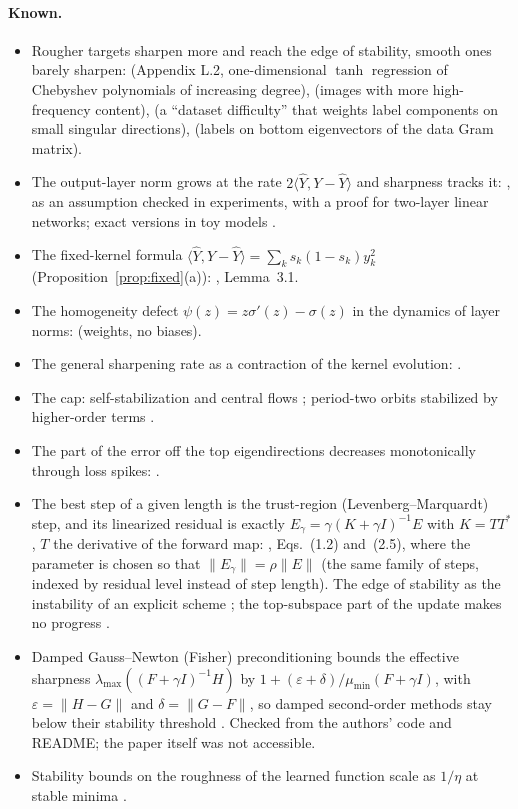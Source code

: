 \documentclass[11pt]{article}
\theoremstyle{definition}
\theoremstyle{remark}
\newcommand{\ip}[2]{\langle #1,#2\rangle}
\begin{document}
\paragraph{Known.}
\begin{itemize}
\item Rougher targets sharpen more and reach the edge of stability, smooth ones barely sharpen: \cite{cohen2021} (Appendix L.2, one-dimensional $\tanh$ regression of Chebyshev polynomials of increasing degree), \cite{ghosh2025} (images with more high-frequency content), \cite{yoo2025} (a ``dataset difficulty'' that weights label components on small singular directions), \cite{liwangli2022} (labels on bottom eigenvectors of the data Gram matrix).
\item The output-layer norm grows at the rate $2\ip{\hat Y}{Y - \hat Y}$ and sharpness tracks it: \cite{liwangli2022}, as an assumption checked in experiments, with a proof for two-layer linear networks; exact versions in toy models \cite{lewkowycz2020,kalra2025,liu2025,jiang2025}.
\item The fixed-kernel formula $\ip{\hat Y}{Y - \hat Y} = \sum_ks_k(1 - s_k)y_k^2$ (Proposition~\ref{prop:fixed}(a)): \cite{liwangli2022}, Lemma~3.1.
\item The homogeneity defect $\psi(z) = z\sigma'(z) - \sigma(z)$ in the dynamics of layer norms: \cite{rawal2026} (weights, no biases).
\item The general sharpening rate as a contraction of the kernel evolution: \cite{huangyau2020,agarwala2023,damian2023}.
\item The cap: self-stabilization \cite{damian2023} and central flows \cite{cohen2025}; period-two orbits stabilized by higher-order terms \cite{chenbruna2023,zhu2023,ma2022,litman2026,gan2026}.
\item The part of the error off the top eigendirections decreases monotonically through loss spikes: \cite{zhu2024catapult}.
\item The best step of a given length is the trust-region (Levenberg--Marquardt) step, and its linearized residual is exactly $E_\gamma = \gamma(K + \gamma I)^{-1}E$ with $K = TT^*$, $T$ the derivative of the forward map: \cite{hanke1997}, Eqs.~(1.2) and~(2.5), where the parameter is chosen so that $\|E_\gamma\| = \rho\|E\|$ (the same family of steps, indexed by residual level instead of step length). The edge of stability as the instability of an explicit scheme \cite{sun2022}; the top-subspace part of the update makes no progress \cite{songahnyun2025}.
\item Damped Gauss--Newton (Fisher) preconditioning bounds the effective sharpness $\lambda_{\max}((F + \gamma I)^{-1}H)$ by $1 + (\varepsilon + \delta)/\mu_{\min}(F + \gamma I)$, with $\varepsilon = \|H - G\|$ and $\delta = \|G - F\|$, so damped second-order methods stay below their stability threshold \cite{ahad2026}. Checked from the authors' code and README; the paper itself was not accessible.
\item Stability bounds on the roughness of the learned function scale as $1/\eta$ at stable minima \cite{mulayoff2021,qiao2024}.
\end{itemize}
\end{document}

